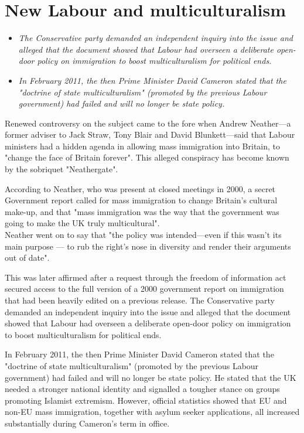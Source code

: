 \section{New Labour and
multiculturalism}\label{new-labour-and-multiculturalism}

\begin{itemize}
\item
  \emph{The Conservative party demanded an independent inquiry into the
  issue and alleged that the document showed that Labour had overseen a
  deliberate open-door policy on immigration to boost multiculturalism
  for political ends.}
\item
  \emph{In February 2011, the then Prime Minister David Cameron stated
  that the "doctrine of state multiculturalism" (promoted by the
  previous Labour government) had failed and will no longer be state
  policy.}
\end{itemize}

Renewed controversy on the subject came to the fore when Andrew
Neather---a former adviser to Jack Straw, Tony Blair and David
Blunkett---said that Labour ministers had a hidden agenda in allowing
mass immigration into Britain, to "change the face of Britain forever".
This alleged conspiracy has become known by the sobriquet "Neathergate".

According to Neather, who was present at closed meetings in 2000, a
secret Government report called for mass immigration to change Britain's
cultural make-up, and that "mass immigration was the way that the
government was going to make the UK truly multicultural".\\
Neather went on to say that "the policy was intended---even if this
wasn't its main purpose --- to rub the right's nose in diversity and
render their arguments out of date".

This was later affirmed after a request through the freedom of
information act secured access to the full version of a 2000 government
report on immigration that had been heavily edited on a previous
release. The Conservative party demanded an independent inquiry into the
issue and alleged that the document showed that Labour had overseen a
deliberate open-door policy on immigration to boost multiculturalism for
political ends.

In February 2011, the then Prime Minister David Cameron stated that the
"doctrine of state multiculturalism" (promoted by the previous Labour
government) had failed and will no longer be state policy. He stated
that the UK needed a stronger national identity and signalled a tougher
stance on groups promoting Islamist extremism. However, official
statistics showed that EU and non-EU mass immigration, together with
asylum seeker applications, all increased substantially during Cameron's
term in office.

